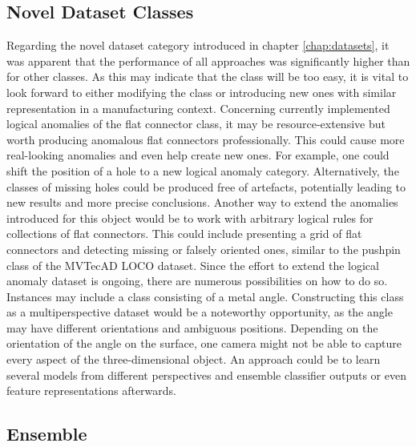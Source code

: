 \subsection{Novel Dataset Classes}
Regarding the novel dataset category introduced in chapter \ref{chap:datasets}, it was apparent that the performance of all approaches was significantly higher than for other classes. 
As this may indicate that the class will be too easy, it is vital to look forward to either modifying the class or introducing new ones with similar representation in a 
manufacturing context. \newline
Concerning currently implemented logical anomalies of the flat connector class, it may be resource-extensive but worth producing anomalous flat connectors professionally. This 
could cause more real-looking anomalies and even help create new ones. For example, one could shift the position of a hole to a new logical anomaly category. Alternatively, the classes 
of missing holes could be produced free of artefacts, potentially leading to new results and more precise conclusions. Another way to extend the anomalies introduced for this 
object would be to work with arbitrary logical rules for collections of flat connectors. This could include presenting a grid of flat connectors and detecting missing or falsely 
oriented ones, similar to the pushpin class of the MVTecAD LOCO \cite{LOCODentsAndScratchesBergmann2022} dataset.\newline 
Since the effort to extend the logical anomaly dataset is ongoing, there are numerous possibilities on how to do so. Instances may include a class consisting of a metal angle. 
Constructing this class as a multiperspective dataset would be a noteworthy opportunity, as the angle may have different orientations and ambiguous positions. Depending 
on the orientation of the angle on the surface, one camera might not be able to capture every aspect of the three-dimensional object. An approach could be to learn several models 
from different perspectives and ensemble classifier outputs or even feature representations afterwards.

\subsection{Ensemble}
\label{subsec:ensembleconc}

